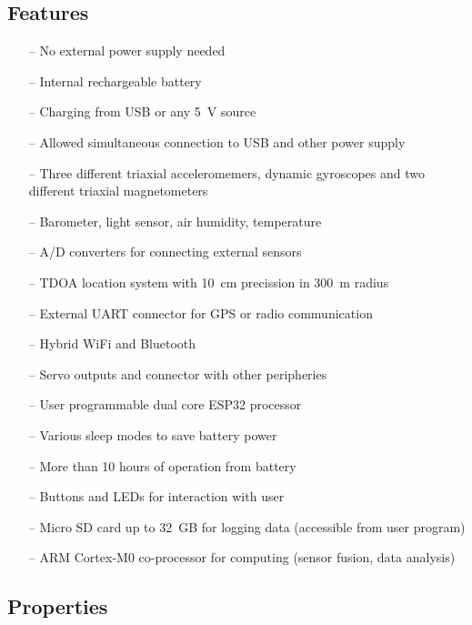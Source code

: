 \subsection{Features}
\begin{itemize}
	\setlength\itemsep{0.2em}
	\item[--] No external power supply needed
	\item[--] Internal rechargeable battery
	\item[--] Charging from USB or any \SI{5}{V} source
	\item[--] Allowed simultaneous connection to USB and other power supply
	\item[--] Three different triaxial acceleromemers, dynamic gyroscopes and two different triaxial magnetometers
	\item[--] Barometer, light sensor, air humidity, temperature
	\item[--] A/D converters for connecting external sensors
	\item[--] TDOA location system with \SI{10}{cm} precission in \SI{300}{m} radius
	\item[--] External UART connector for GPS or radio communication
	\item[--] Hybrid WiFi and Bluetooth
	\item[--] Servo outputs and connector with other peripheries
	\item[--] User programmable dual core ESP32 processor
	\item[--] Various sleep modes to save battery power
	\item[--] More than 10 hours of operation from battery
	\item[--] Buttons and LEDs for interaction with user
	\item[--] Micro SD card up to \SI{32}{GB} for logging data (accessible from user program)
	\item[--] ARM Cortex-M0 co-processor for computing (sensor fusion, data analysis)
\end{itemize}

\subsection{Properties}

